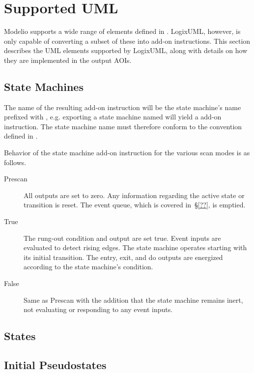 \section{Supported UML}

Modelio supports a wide range of elements defined in \textcite{OMGUML}.
LogixUML, however, is only capable of converting a subset of these into
add-on instructions. This section describes the UML elements supported
by LogixUML, along with details on how they are implemented in the output
AOIs.


\subsection{State Machines}

The name of the resulting add-on instruction will be the state machine's
name prefixed with , e.g. exporting a state
machine named  will yield a
 add-on instruction.
The state machine name must therefore conform to the convention defined
in \textcite[Chapter~2]{AOI}.

Behavior of the state machine add-on instruction for the various scan
modes is as follows.

\begin{description}
  \item[Prescan] All outputs are set to zero. Any information regarding
    the active state or transition is reset. The event queue, which is
    covered in~\S\ref{??}, is emptied.

  \item[True] The rung-out condition and  output are set
    true. Event inputs are evaluated to detect rising edges. The state machine
    operates starting with its initial transition. The entry, exit, and
    do outputs are energized according to the state machine's condition.

  \item[False] Same as Prescan with the addition that the state machine
    remains inert, not evaluating or responding to any event inputs.
\end{description}


\subsection{States}
\label{ss:states}


\subsection{Initial Pseudostates}


